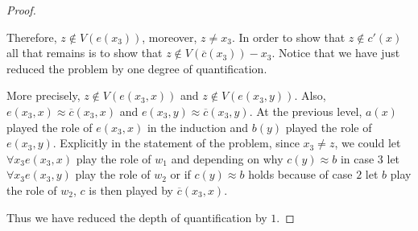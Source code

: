 \documentclass{article}
\theoremstyle{problemstyle}
\theoremstyle{lemmastyle}
\theoremstyle{theoremstyle}
\theoremstyle{problemstyle}
\begin{document}
\begin{proof}
\begin{flushleft}
\end{flushleft}

Therefore, $z \notin V(e(x_3))$, moreover, $z \neq x_3$.  In order to show that $z \notin c'(x)$ all that remains is to show that $z\notin V(\overline{c}(x_3)) - {x_3}$. Notice that we have just reduced the problem by one degree of quantification. 

More precisely, $z \notin V(e(x_3,x))$ and $z \notin V(e(x_3,y))$. Also, $e(x_3,x) \approx \overline{c}(x_3,x)$ and $e(x_3,y) \approx \overline{c}(x_3,y)$.  At the previous level, $a(x)$ played the role of $e(x_3,x)$ in the induction and $b(y)$ played the role of $e(x_3,y)$. Explicitly in the statement of the problem, since $x_3 \neq z$, we could let  $\forall x_3e(x_3,x)$ play the role of $w_1$ and depending on why $c(y) \approx b$ in case 3 let $\forall x_3e(x_3,y)$ play the role of $w_2$ or if $c(y) \approx b$ holds because of case $2$ let $b$ play the role of $w_2$, $c$ is then played by $\overline{c}(x_3,x)$. 

Thus we have reduced the depth of quantification by $1$. 
\end{proof}
\end{document}
